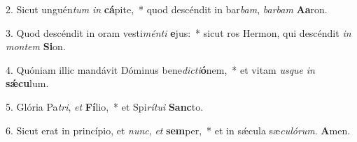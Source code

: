 2. Sicut unguén\textit{tum} \textit{in} \textbf{cá}pite,~*  quod descéndit in bar\textit{bam}, \textit{bar}\textit{bam} \textbf{A}\textbf{a}ron.\

3. Quod descéndit in oram vesti\textit{mén}\textit{ti} \textbf{e}jus:~*  sicut ros Hermon, qui descéndit \textit{in} \textit{mon}\textit{tem} \textbf{Si}on.\

4. Quóniam illic mandávit Dóminus bene\textit{dic}\textit{ti}\textbf{ó}nem,~*  et vitam \textit{us}\textit{que} \textit{in} \textbf{sǽ}\textbf{cu}lum.\

5. Glória Pa\textit{tri}, \textit{et} \textbf{Fí}lio,~*  et Spi\textit{rí}\textit{tu}\textit{i} \textbf{Sanc}to.\

6. Sicut erat in princípio, et \textit{nunc}, \textit{et} \textbf{sem}per,~*  et in sǽcula sæ\textit{cu}\textit{ló}\textit{rum}. \textbf{A}men.\

